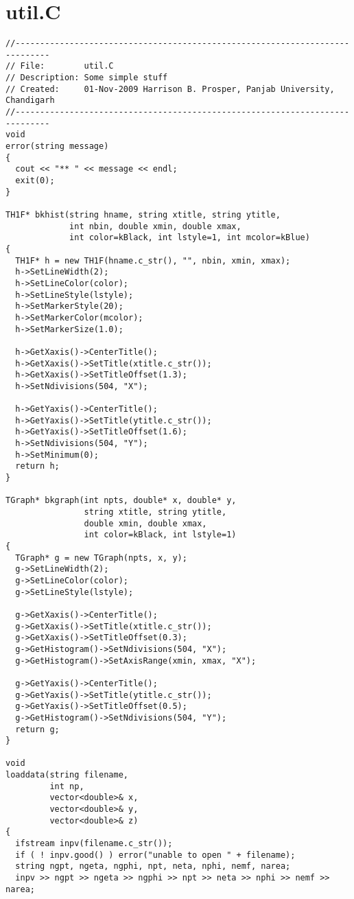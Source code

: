 \hypertarget{util_8C-example}{
\section{util.C}
}


\footnotesize\begin{verbatim}//-----------------------------------------------------------------------------
// File:        util.C
// Description: Some simple stuff
// Created:     01-Nov-2009 Harrison B. Prosper, Panjab University, Chandigarh
//-----------------------------------------------------------------------------
void 
error(string message)
{
  cout << "** " << message << endl;
  exit(0);
}

TH1F* bkhist(string hname, string xtitle, string ytitle,
             int nbin, double xmin, double xmax,
             int color=kBlack, int lstyle=1, int mcolor=kBlue)
{
  TH1F* h = new TH1F(hname.c_str(), "", nbin, xmin, xmax);
  h->SetLineWidth(2);
  h->SetLineColor(color);
  h->SetLineStyle(lstyle);
  h->SetMarkerStyle(20);
  h->SetMarkerColor(mcolor);
  h->SetMarkerSize(1.0);

  h->GetXaxis()->CenterTitle();
  h->GetXaxis()->SetTitle(xtitle.c_str());
  h->GetXaxis()->SetTitleOffset(1.3);
  h->SetNdivisions(504, "X");
  
  h->GetYaxis()->CenterTitle();
  h->GetYaxis()->SetTitle(ytitle.c_str());
  h->GetYaxis()->SetTitleOffset(1.6);
  h->SetNdivisions(504, "Y");
  h->SetMinimum(0);
  return h;
}

TGraph* bkgraph(int npts, double* x, double* y,
                string xtitle, string ytitle,
                double xmin, double xmax,
                int color=kBlack, int lstyle=1)
{
  TGraph* g = new TGraph(npts, x, y);
  g->SetLineWidth(2);
  g->SetLineColor(color);
  g->SetLineStyle(lstyle);

  g->GetXaxis()->CenterTitle();
  g->GetXaxis()->SetTitle(xtitle.c_str());
  g->GetXaxis()->SetTitleOffset(0.3);
  g->GetHistogram()->SetNdivisions(504, "X");
  g->GetHistogram()->SetAxisRange(xmin, xmax, "X");

  g->GetYaxis()->CenterTitle();
  g->GetYaxis()->SetTitle(ytitle.c_str());
  g->GetYaxis()->SetTitleOffset(0.5);
  g->GetHistogram()->SetNdivisions(504, "Y");
  return g;
}

void 
loaddata(string filename,
         int np,
         vector<double>& x,
         vector<double>& y,
         vector<double>& z)
{
  ifstream inpv(filename.c_str());
  if ( ! inpv.good() ) error("unable to open " + filename);
  string ngpt, ngeta, ngphi, npt, neta, nphi, nemf, narea;
  inpv >> ngpt >> ngeta >> ngphi >> npt >> neta >> nphi >> nemf >> narea;
  

\end{verbatim}
